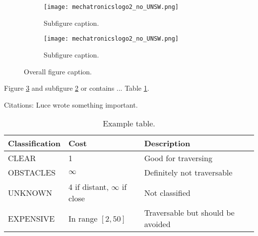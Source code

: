 \begin{figure}[!ht] \centering
\captionsetup[subfigure]{width=2.5in} %
\begin{subfigure}[t]{0.45\textwidth}
\texttt{[image: mechatronicslogo2\_no\_UNSW.png]}
\caption[Subfigure caption.]{Subfigure caption.}
\label{fig:intro_subfig1}
\end{subfigure}
\begin{subfigure}[t]{0.45\textwidth}
\texttt{[image: mechatronicslogo2\_no\_UNSW.png]}
\caption[Subfigure caption.]{Subfigure caption.}
\label{fig:intro_subfig2}
\end{subfigure}
\caption[Abbreviated caption.]{Overall figure caption.}
\label{fig:intro_subfig}
\end{figure}

Figure \ref{fig:intro_subfig} and subfigure \ref{fig:intro_subfig2} or  contains ...
Table \ref{tab:intro_table_1}. 

Citations: Luce \cite{luce_probabilistic_1958} wrote something important.


\begin{table}[h!]
\begin{center}
\begin{tabular}{ p{3cm}  p{4cm} | p{6.5cm} }
\hline
Classification & Cost & Description\\ \hline \hline
CLEAR & 1 & Good for traversing\\ \hline
OBSTACLES  & $\infty$ & Definitely not traversable\\ \hline
UNKNOWN & 4 if distant, $\infty$ if close & Not classified\\ \hline
EXPENSIVE & In range $[2, 50]$ & Traversable but should be avoided\\ \hline
\end{tabular}
\end{center}
\caption[Example table (short caption).]{Example table.}
\label{tab:intro_table_1}
\end{table}